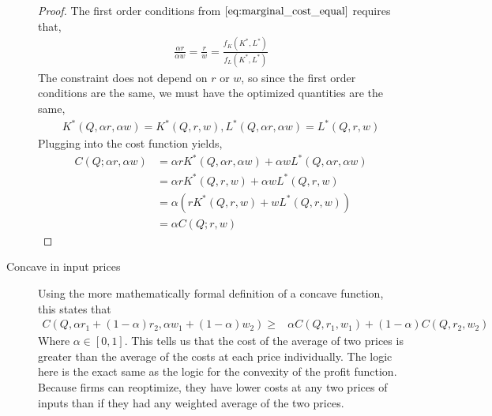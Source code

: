 \begin{description}
    \begin{proof}
        The first order conditions from $\ref{eq:marginal_cost_equal}$ requires that,
        \begin{align*}
            \frac{\alpha r}{\alpha w} = \frac{r}{w} = \frac{f_K(K^*, L^*)}{f_L(K^*, L^*)}
        \end{align*}
        The constraint does not depend on $r$ or $w$, so since the first order conditions are the same, we must have the optimized quantities are the same,
        \begin{align*}
            K^*(Q, \alpha r, \alpha w) = K^*(Q, r, w), L^*(Q, \alpha r, \alpha w) = L^*(Q, r, w)
        \end{align*}
        Plugging into the cost function yields,
        \begin{align*}
            C(Q; \alpha r, \alpha w) &= \alpha rK^*(Q, \alpha r, \alpha w) + \alpha w L^*(Q, \alpha r, \alpha w)\\
            &= \alpha r K^*(Q, r, w) + \alpha w L^*(Q, r, w) \\
            &= \alpha (rK^*(Q, r, w) + w L^*(Q, r, w)) \\
            &= \alpha C(Q; r, w)
        \end{align*}
    \end{proof}
    \item[Concave in input prices] Using the more mathematically formal definition of a concave function, this states that
    \begin{align*}
        C(Q, \alpha r_1 + (1 - \alpha) r_2, \alpha w_1 + (1 - \alpha)w_2) \geq &\alpha C(Q, r_1,  w_1) + (1 - \alpha)C(Q, r_2, w_2)
    \end{align*}
    Where $\alpha \in [0, 1]$. This tells us that the cost of the average of two prices is greater than the average of the costs at each price individually. The logic here is the exact same as the logic for the convexity of the profit function. Because firms can reoptimize, they have lower costs at any two prices of inputs than if they had any weighted average of the two prices. 


\end{description}
